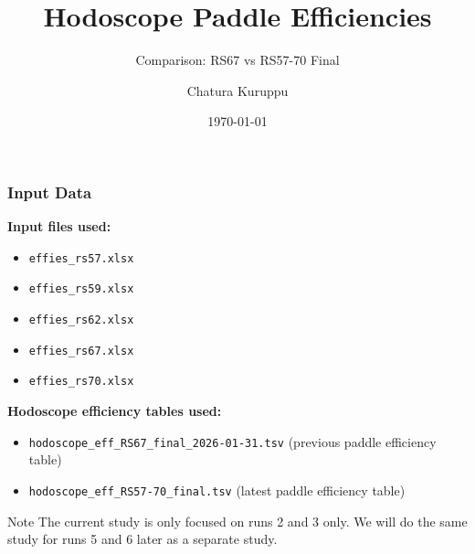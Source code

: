 \documentclass[aspectratio=169]{beamer}
\title{Hodoscope Paddle Efficiencies}
\subtitle{Comparison: RS67 vs RS57-70 Final}
\author{Chatura Kuruppu}
\date{\today}
\begin{document}
\begin{frame}
    \titlepage
\end{frame}

\begin{frame}
    \frametitle{Input Data}
    \textbf{Input files used:}
    \begin{itemize}
        \item \texttt{effies\_rs57.xlsx}
        \item \texttt{effies\_rs59.xlsx}
        \item \texttt{effies\_rs62.xlsx}
        \item \texttt{effies\_rs67.xlsx}
        \item \texttt{effies\_rs70.xlsx}
    \end{itemize}
    
    \vspace{0.2cm}
    \textbf{Hodoscope efficiency tables used:}
    \begin{itemize}
        \item \texttt{hodoscope\_eff\_RS67\_final\_2026-01-31.tsv} (previous paddle efficiency table)
        \item \texttt{hodoscope\_eff\_RS57-70\_final.tsv} (latest paddle efficiency table)
    \end{itemize}

    \vspace{0.2cm}
    \begin{block}{Note}
    The current study is only focused on runs 2 and 3 only. We will do the same study for runs 5 and 6 later as a separate study.
    \end{block}
\end{frame}
\end{document}
